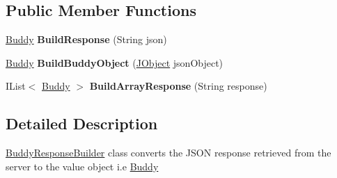 \subsection*{Public Member Functions}
\begin{DoxyCompactItemize}
\item 
\hypertarget{classcom_1_1shephertz_1_1app42_1_1paas_1_1sdk_1_1csharp_1_1buddy_1_1_buddy_response_builder_a275d4003581d3aafa2c0a12d40911dce}{\hyperlink{classcom_1_1shephertz_1_1app42_1_1paas_1_1sdk_1_1csharp_1_1buddy_1_1_buddy}{Buddy} {\bfseries Build\+Response} (String json)}\label{classcom_1_1shephertz_1_1app42_1_1paas_1_1sdk_1_1csharp_1_1buddy_1_1_buddy_response_builder_a275d4003581d3aafa2c0a12d40911dce}

\item 
\hypertarget{classcom_1_1shephertz_1_1app42_1_1paas_1_1sdk_1_1csharp_1_1buddy_1_1_buddy_response_builder_a1f7f5af9593dd22f5bddcfe6788c8c36}{\hyperlink{classcom_1_1shephertz_1_1app42_1_1paas_1_1sdk_1_1csharp_1_1buddy_1_1_buddy}{Buddy} {\bfseries Build\+Buddy\+Object} (\hyperlink{class_simple_j_s_o_n_1_1_j_object}{J\+Object} json\+Object)}\label{classcom_1_1shephertz_1_1app42_1_1paas_1_1sdk_1_1csharp_1_1buddy_1_1_buddy_response_builder_a1f7f5af9593dd22f5bddcfe6788c8c36}

\item 
\hypertarget{classcom_1_1shephertz_1_1app42_1_1paas_1_1sdk_1_1csharp_1_1buddy_1_1_buddy_response_builder_a903828e4bd2027971858e623e5418369}{I\+List$<$ \hyperlink{classcom_1_1shephertz_1_1app42_1_1paas_1_1sdk_1_1csharp_1_1buddy_1_1_buddy}{Buddy} $>$ {\bfseries Build\+Array\+Response} (String response)}\label{classcom_1_1shephertz_1_1app42_1_1paas_1_1sdk_1_1csharp_1_1buddy_1_1_buddy_response_builder_a903828e4bd2027971858e623e5418369}

\end{DoxyCompactItemize}


\subsection{Detailed Description}
\hyperlink{classcom_1_1shephertz_1_1app42_1_1paas_1_1sdk_1_1csharp_1_1buddy_1_1_buddy_response_builder}{Buddy\+Response\+Builder} class converts the J\+S\+O\+N response retrieved from the server to the value object i.\+e \hyperlink{classcom_1_1shephertz_1_1app42_1_1paas_1_1sdk_1_1csharp_1_1buddy_1_1_buddy}{Buddy} 

